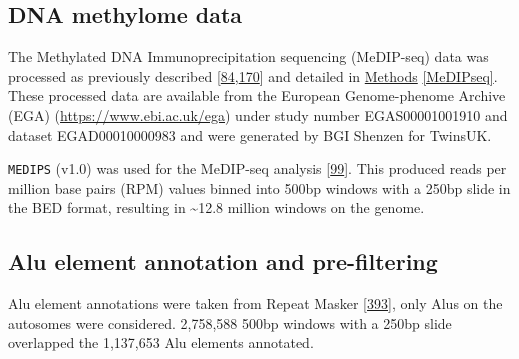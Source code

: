 \documentclass[
]{book}
\begin{document}
\hypertarget{dna-methylome-data}{%
\subsection{DNA methylome data}\label{dna-methylome-data}}

The Methylated DNA Immunoprecipitation sequencing (MeDIP-seq) data was processed as previously described {[}\protect\hyperlink{ref-Bell2017a}{84},\protect\hyperlink{ref-Bell2016}{170}{]} and detailed in \protect\hyperlink{MeDIPseq}{Methods} \ref{MeDIPseq}.
These processed data are available from the European Genome-phenome Archive (EGA) (\url{https://www.ebi.ac.uk/ega}) under study number EGAS00001001910 and dataset EGAD00010000983 and were generated by BGI Shenzen for TwinsUK.

\texttt{MEDIPS} (v1.0) was used for the MeDIP-seq analysis {[}\protect\hyperlink{ref-Lienhard2014}{99}{]}.
This produced reads per million base pairs (RPM) values binned into 500bp windows with a 250bp slide in the BED format, resulting in \textasciitilde12.8 million windows on the genome.

\hypertarget{alu-element-annotation-and-pre-filtering}{%
\subsection{Alu element annotation and pre-filtering}\label{alu-element-annotation-and-pre-filtering}}

Alu element annotations were taken from Repeat Masker {[}\protect\hyperlink{ref-Smit2009}{393}{]}, only Alus on the autosomes were considered.
2,758,588 500bp windows with a 250bp slide overlapped the 1,137,653 Alu elements annotated.
\end{document}
